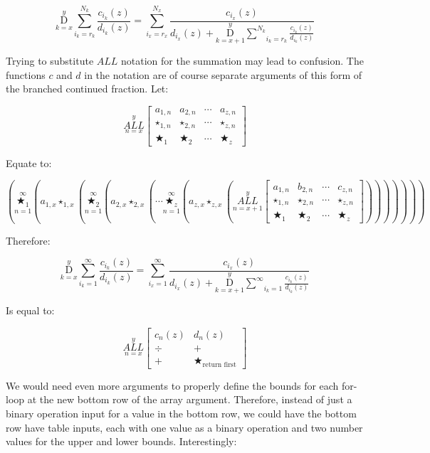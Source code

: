 \documentclass{article}
\begin{document}
$$\underset{k=x}{\overset{y}{ \mathrm D}} \underset{i_k=r_k}{\overset{N_k}{ \sum}} \frac{c_{i_k} (z)}{d_{i_k} (z)} = \underset{i_x=r_x}{\overset{N_x}{ \sum}} \frac{c_{i_x}(z)}{d_{i_x}(z)+ \underset{k=x+1}{\overset{y}{ \mathrm D}} \underset{i_k=r_k}{\overset{N_k}{ \sum}} \frac{c_{i_k} (z)}{d_{i_k} (z)}}$$

Trying to substitute $ALL$ notation for the summation may lead to confusion. The functions $c$ and $d$ in the notation are of course separate arguments of this form of the branched continued fraction. Let:

$$\underset{n=x}{\overset{y}{ALL}}
\begin{bmatrix}
a_{1,n} & a_{2,n} & \cdots & a_{z,n} \\
\star_{1,n} & \star_{2,n} & \cdots & \star_{z,n} \\ \bigstar_{1} & \bigstar_{2} & \cdots & \bigstar_{z}
\end{bmatrix}$$

Equate to:

$$(\underset{n=1}{\overset{\infty}{\bigstar_1}}(a_{1,x} \star_{1,x} (\underset{n=1}{\overset{\infty}{\bigstar_2}} (a_{2, x} \star_{2,x} (\cdots \underset{n=1}{\overset{\infty}{\bigstar_z}} (a_{z,x} \star_{z,x} (\underset{n=x+1}{\overset{y}{ALL}}
\begin{bmatrix}
a_{1,n} & b_{2,n} & \cdots & c_{z,n} \\
\star_{1,n} & \star_{2,n} & \cdots & \star_{z,n} \\ \bigstar_{1} & \bigstar_{2} & \cdots & \bigstar_{z}
\end{bmatrix})))))))$$

Therefore:

$$\underset{k=x}{\overset{y}{ \mathrm D}} \underset{i_k=1}{\overset{\infty}{ \sum}} \frac{c_{i_k} (z)}{d_{i_k} (z)} = \underset{i_x=1}{\overset{\infty}{ \sum}} \frac{c_{i_x}(z)}{d_{i_x}(z)+ \underset{k=x+1}{\overset{y}{ \mathrm D}} \underset{i_k=1}{\overset{\infty}{ \sum}} \frac{c_{i_k} (z)}{d_{i_k} (z)}}$$

Is equal to:

$$\underset{n=x}{\overset{y}{ALL}}
\begin{bmatrix}
c_n(z) & d_n(z) \\
\div & + \\ + & \bigstar_{\text{return first}}
\end{bmatrix}$$

We would need even more arguments to properly define the bounds for each for-loop at the new bottom row of the array argument. Therefore, instead of just a binary operation input for a value in the bottom row, we could have the bottom row have table inputs, each with one value as a binary operation and two number values for the upper and lower bounds. Interestingly:
\end{document}
